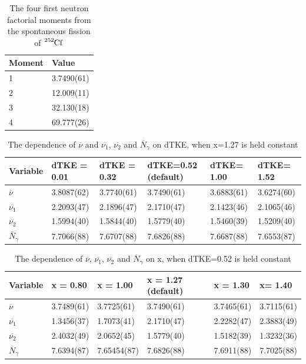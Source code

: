 \documentclass[]{article}
\begin{document}
\begin{table} [H]
	\centering
	\caption{The four first neutron factorial moments from the spontaneous fission of $\ce{^{252}Cf}$}
	\begin{tabularx}{\textwidth}{XX} \hline
		\label{tab:Cf252_n_moments}
		Moment & Value \\ \hline
		1 & 3.7490(61) \\
		2 & 12.009(11)\\
		3 & 32.130(18)\\
		4 & 69.777(26)\\ 
	\end{tabularx}
\end{table}

\begin{table} [H]
	\centering
	\caption{The dependence of $\overline{\nu}$  and $\overline{\nu_1}$, $\overline{\nu_2}$ and $\overline{N}_{\gamma}$ on dTKE, when x=1.27 is held constant}
	\begin{tabularx}{\textwidth}{XXXXXX} \hline
		\label{tab:dependence_on_dTKE}
		Variable & dTKE = 0.01&dTKE = 0.32 &dTKE=0.52 (default) & dTKE= 1.00 & dTKE= 1.52\\ \hline
		$\overline{\nu}$ & 3.8087(62) & 3.7740(61) & 3.7490(61) & 3.6883(61) & 3.6274(60)\\
		$\overline{\nu_1}$ & 2.2093(47) & 2.1896(47)  & 2.1710(47)& 2.1423(46) & 2.1065(46) \\
		$\overline{\nu_2}$ & 1.5994(40) &1.5844(40) & 1.5779(40) & 1.5460(39) &  1.5209(40)\\ 
		$\overline{N}_{\gamma}$ & 7.7066(88) & 7.6707(88) & 7.6826(88) & 7.6687(88) & 7.6553(87)\\
		\hline
	\end{tabularx}
\end{table}

\begin{table} [H]
	\centering
	\caption{The dependence of $\overline{\nu}$, $\overline{\nu_1}$, $\overline{\nu_2}$ and $\overline{N}_{\gamma}$ on x, when dTKE=0.52 is held constant}
	\begin{tabularx}{\textwidth}{XXXXXX} \hline
		\label{tab:dependence_on_x}
		Variable & x = 0.80 & x  = 1.00 & x = 1.27 (default) & x = 1.30 & x= 1.40\\ \hline
		$\overline{\nu}$ & 3.7489(61) & 3.7725(61) & 3.7490(61) & 3.7465(61) & 3.7115(61)\\
		$\overline{\nu_1}$ & 1.3456(37) & 1.7073(41)  & 2.1710(47) & 2.2282(47) & 2.3883(49) \\
		$\overline{\nu_2}$ & 2.4032(49)  & 2.0652(45) & 1.5779(40) & 1.5182(39) & 1.3232(36) \\ 
		$\overline{N}_{\gamma}$ & 7.6394(87) & 7.65454(87) & 7.6826(88) & 7.6911(88) & 7.7025(88)\\
		\hline
	\end{tabularx}
\end{table}
\end{document}
